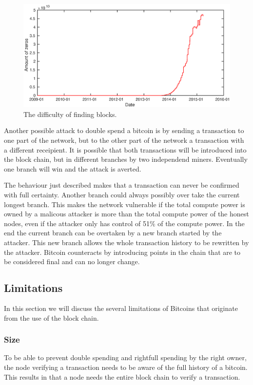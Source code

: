 \begin{figure}
        \centerline{\includegraphics[scale=0.5]{relatedWork/figs/difficulty/difficulty.eps}}
	\caption{The difficulty of finding blocks.}
	\label{fig:hash-difficulty}
\end{figure}

Another possible attack to double spend a bitcoin is by sending a transaction to one part of the network,
but to the other part of the network a transaction with a different receipient.
It is possible that both transactions will be introduced into the block chain, but in different branches by two independend miners.
Eventually one branch will win and the attack is averted.

The behaviour just described makes that a transaction can never be confirmed with full certainty.
Another branch could always possibly over take the current longest branch.
This makes the network vulnerable if the total compute power is owned by a malicous attacker is more than the total compute power of the honest nodes,
even if the attacker only has control of 51\% of the compute power.
In the end the current branch can be overtaken by a new branch started by the attacker.
This new branch allows the whole transaction history to be rewritten by the attacker.
Bitcoin counteracts by introducing points in the chain that are to be considered final and can no longer change.

\subsection{Limitations}
In this section we will discuss the several limitations of Bitcoins
that originate from the use of the block chain.

\subsubsection{Size}
\label{bitcoin-limit-size}
To be able to prevent double spending and rightfull spending by the right owner,
the node verifying a transaction needs to be aware of the full history of a bitcoin.
This results in that a node needs the entire block chain to verify a transaction.

